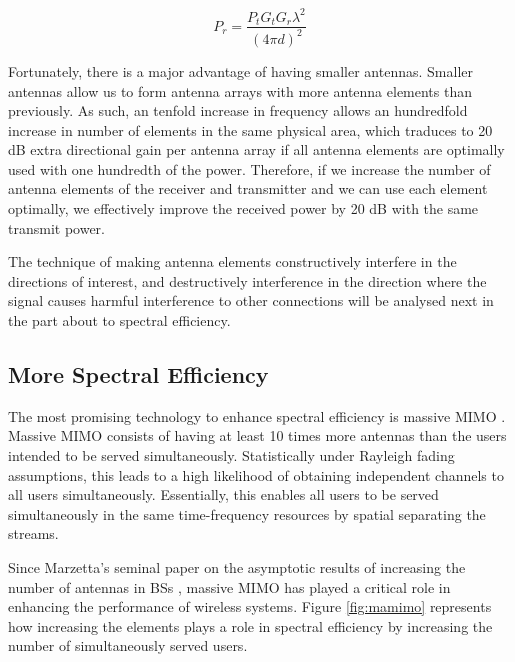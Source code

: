 \begin{equation} \label{eq:Friis2}
    P_r =\frac{P_t G_t G_r \lambda^2}{(4\pi d)^2}
\end{equation}

Fortunately, there is a major advantage of having smaller antennas. Smaller antennas allow us to form antenna arrays with more antenna elements than previously. As such, an tenfold increase in frequency allows an hundredfold increase in number of elements in the same physical area, which traduces to 20 dB extra directional gain per antenna array if all antenna elements are optimally used with one hundredth of the power. Therefore, if we increase the number of antenna elements of the receiver and transmitter and we can use each element optimally, we effectively improve the received power by 20 dB with the same transmit power. 

The technique of making antenna elements constructively interfere in the directions of interest, and destructively interference in the direction where the signal causes harmful interference to other connections will be analysed next in the part about to spectral efficiency.


\subsection*{More Spectral Efficiency}

The most promising technology to enhance spectral efficiency is massive \ac{MIMO} \cite{8861014}. Massive \ac{MIMO} consists of having at least 10 times more antennas than the users intended to be served simultaneously. Statistically under Rayleigh fading assumptions, this leads to a high likelihood of obtaining independent channels to all users simultaneously. Essentially, this enables all users to be served simultaneously in the same time-frequency resources by spatial separating the streams.

Since Marzetta's seminal paper on the asymptotic results of increasing the number of antennas in \acp{BS} \cite{5595728}, massive \ac{MIMO} has played a critical role in enhancing the performance of wireless systems. Figure \ref{fig:mamimo} represents how increasing the elements plays a role in spectral efficiency by increasing the number of simultaneously served users.



